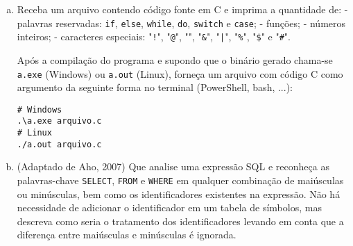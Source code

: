 \begin{enumerate}[a)]
\item Receba um arquivo contendo código fonte em C e imprima a quantidade de:
    - palavras reservadas: {\tt if}, {\tt else}, {\tt while}, {\tt do}, {\tt switch} e {\tt case};
    - funções;
    - números inteiros;
    - caracteres especiais: "{\tt !}", "{\tt @}", "{\tt *}", "{\tt \&}", "{\tt |}", "{\tt \%}", "{\tt \$}" e "{\tt \#}".

Após a compilação do programa e supondo que o binário gerado
chama-se {\tt a.exe} (Windows) ou {\tt a.out} (Linux),
forneça um arquivo com código C como argumento
da seguinte forma no terminal (PowerShell, bash, ...):

\begin{verbatim}
# Windows
.\a.exe arquivo.c
# Linux
./a.out arquivo.c
\end{verbatim}

\item (Adaptado de Aho, 2007) Que analise uma expressão SQL e
  reconheça as palavras-chave {\tt SELECT}, {\tt FROM} e {\tt WHERE}
  em qualquer combinação de maiúsculas ou minúsculas, bem como os
  identificadores existentes na expressão.  Não há necessidade de
  adicionar o identificador em um tabela de símbolos, mas descreva
  como seria o tratamento dos identificadores levando em conta que a
  diferença entre maiúsculas e minúsculas é ignorada.
\end{enumerate}
